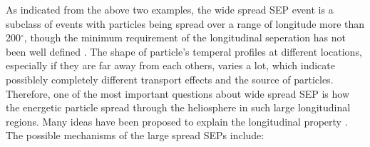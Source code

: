 As indicated from the above two examples, the wide spread \ac{SEP} event is a subclass of events with particles being spread over a range of longitude more than 200$^\circ$, though the minimum requirement of the longitudinal seperation has not been well defined \citep{Dresing_2014phd}. The shape of particle's temperal profiles at different locations, especially if they are far away from each others, varies a lot, which indicate possiblely completely different transport effects and the source of particles. 
Therefore, one of the most important questions about wide spread \ac{SEP} is how the energetic particle spread through the heliosphere in such large longitudinal regions. Many ideas have been proposed to explain the longitudinal property \citep{Richardson2014SoPh, Dresing2012SoPh,Desai_Diacalone2016LRSP, Reames2021LNP}. The possible mechanisms of the large spread SEPs include:

